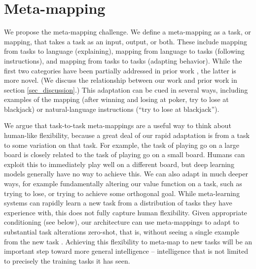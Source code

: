 \documentclass{article}
\begin{document}
\vspace{-0.25em}
\section{Meta-mapping}
\vspace{-0.5em} %
We propose the meta-mapping challenge. We define a meta-mapping as a task, or mapping, that takes a task as an input, output, or both. These include mapping from tasks to language (explaining), mapping from language to tasks (following instructions), and mapping from tasks to tasks (adapting behavior). While the first two categories have been partially addressed in prior work \citep[e.g.][]{Hermann2017, Co-Reyes2019}, the latter is more novel. (We discuss the relationship between our work and prior work in section \ref{sec_discussion}.) This adaptation can be cued in several ways, including examples of the mapping (after winning and losing at poker, try to lose at blackjack) or natural-language instructions (``try to lose at blackjack''). \par
We argue that task-to-task meta-mappings are a useful way to think about human-like flexibility, because a great deal of our rapid adaptation is from a task to some variation on that task. For example, the task of playing go on a large board is closely related to the task of playing go on a small board. Humans can exploit this to immediately play well on a different board, but deep learning models generally have no way to achieve this. We can also adapt in much deeper ways, for example fundamentally altering our value function on a task, such as trying to lose, or trying to achieve some orthogonal goal. While meta-learning systems can rapidly learn a new task from a distribution of tasks they have experience with, this does not fully capture human flexibility. Given appropriate conditioning (see below), our architecture can use meta-mappings to adapt to substantial task alterations zero-shot, that is, without seeing a single example from the new task \citep{Lake2016}. Achieving this flexibility to meta-map to new tasks will be an important step toward more general intelligence -- intelligence that is not limited to precisely the training tasks it has seen. \par 

\vspace{-0.25em}
\end{document}
